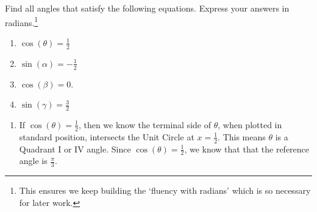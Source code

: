 \documentclass{ximera}
\begin{document}
\begin{example}  \label{solveforangle}  Find all angles that satisfy the following equations. Express your answers in radians.\footnote{This ensures we keep building  the `fluency with radians' which is so necessary for later work.}

\begin{enumerate}

\item  \label{cosineishalf} $\cos(\theta) = \frac{1}{2}$ 

\item \label{sineisnegativehalf} $\sin(\alpha) = -\frac{1}{2}$ 

\item  \label{cosineiszero} $\cos(\beta) = 0$. 

\item  \label{sineisover1} $\sin(\gamma) = \frac{3}{2}$

\end{enumerate}

\begin{explanation} 

\begin{enumerate} 

\item If $\cos(\theta) = \frac{1}{2}$, then we know the terminal side of $\theta$, when plotted in standard position, intersects the Unit Circle at $x = \frac{1}{2}$.  This means $\theta$ is a Quadrant I or IV angle.  Since $\cos(\theta) = \frac{1}{2}$, we know that that the reference angle is $\frac{\pi}{3}$.

\begin{image}
\end{image}
\end{enumerate}
\end{explanation}
\end{example}
\end{document}
